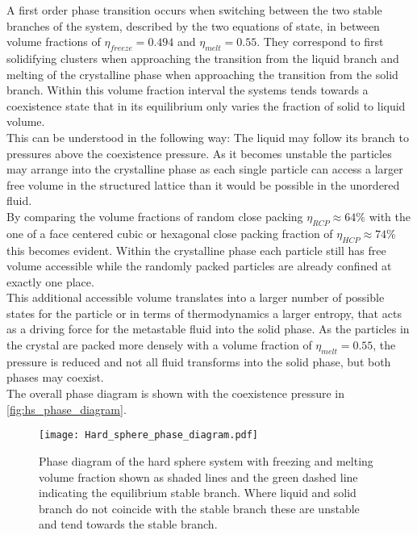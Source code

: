 A first order phase transition occurs when switching between the two stable branches of the system, described by the two equations of state, in between volume fractions of $\eta_{freeze} = 0.494$ and $\eta_{melt}=0.55$. They correspond to first solidifying clusters when approaching the transition from the liquid branch and melting of the crystalline phase when approaching the transition from the solid branch. Within this volume fraction interval the systems tends towards a coexistence state that in its equilibrium only varies the fraction of solid to liquid volume.\\
This can be understood in the following way: The liquid may follow its branch to pressures above the coexistence pressure. As it becomes unstable the particles may arrange into the crystalline phase as each single particle can access a larger free volume in the structured lattice than it would be possible in the unordered fluid.\\
By comparing the volume fractions of random close packing $\eta_{RCP}\approx 64\%$ with the one of a face centered cubic or hexagonal close packing fraction of $\eta_{HCP} \approx 74 \%$ this becomes evident. Within the crystalline phase each particle still has free volume accessible while the randomly packed particles are already confined at exactly one place.\\
This additional accessible volume translates into a larger number of possible states for the particle or in terms of thermodynamics a larger entropy, that acts as a driving force for the metastable fluid into the solid phase. As the particles in the crystal are packed more densely with a volume fraction of $\eta_{melt}=0.55$, the pressure is reduced and not all fluid transforms into the solid phase, but both phases may coexist.\\
The overall phase diagram is shown with the coexistence pressure in \autoref{fig:hs_phase_diagram}.\\
\begin{figure}[h]
\centering
\texttt{[image: Hard\_sphere\_phase\_diagram.pdf]}
\caption[Hard sphere phase diagram]{Phase diagram of the hard sphere system with freezing and melting volume fraction shown as shaded lines and the green dashed line indicating the equilibrium stable branch. Where liquid and solid branch do not coincide with the stable branch these are unstable and tend towards the stable branch.}
\label{fig:hs_phase_diagram}
\end{figure}





